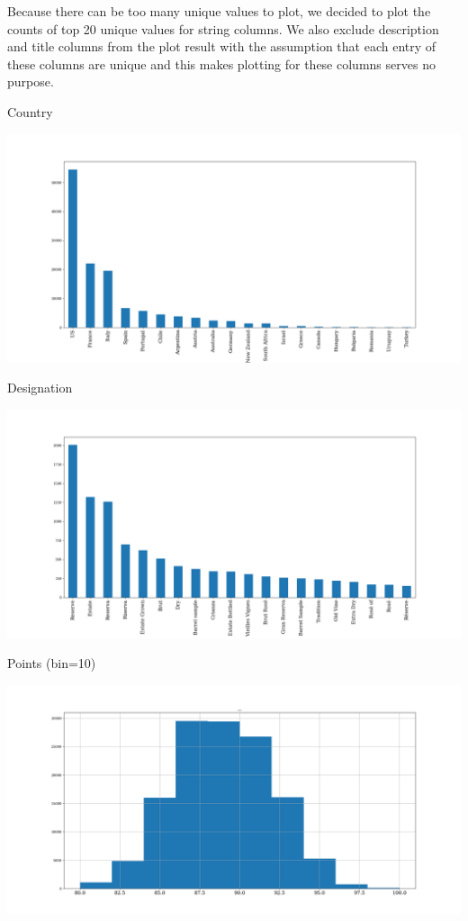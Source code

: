 \documentclass[11pt]{article}
\begin{document}
Because there can be too many unique values to plot, we decided to plot the counts of top 20 unique values for string columns. We also exclude description and title columns from the plot result with the assumption that each entry of these columns are unique and this makes plotting for these columns serves no purpose.

Country

\includegraphics[width=\textwidth,height=\textheight,keepaspectratio]{figures/1c_histogram_of_country.png}

Designation

\includegraphics[width=\textwidth,height=\textheight,keepaspectratio]{figures/1c_histogram_of_designation.png}

Points (bin=10)

\includegraphics[width=\textwidth,height=\textheight,keepaspectratio]{figures/1c_histogram_of_points.png}
\end{document}
